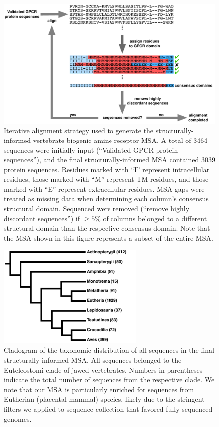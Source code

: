\documentclass[fleqn,10pt]{wlpeerj}
\begin{document}
\newpage

\begin{figure}[htbp]
	\centerline{\includegraphics[width=18cm]{figures/alignment_flowchart.pdf}}
	\caption{\label{flowchart} Iterative alignment strategy used to generate the structurally-informed vertebrate biogenic amine receptor MSA. A total of 3464 sequences were initially input (``Validated GPCR protein sequences''), and the final structurally-informed MSA contained 3039 protein sequences. Residues marked with ``I'' represent intracellular residues, those marked with ``M'' represent TM residues, and those marked with ``E'' represent extracellular residues. MSA gaps were treated as missing data when determining each column's consensus structural domain. Sequenced were removed (``remove highly discordant sequences'') if $\geq 5\%$ of columns belonged to a different structural domain than the respective consensus domain. Note that the MSA shown in this figure represents a subset of the entire MSA.}
\end{figure}


\begin{figure}[htbp]
	\centerline{\includegraphics[width=7cm]{figures/taxonomic_distribution.pdf}}
	\caption{\label{taxa_dist} Cladogram of the taxonomic distribution of all sequences in the final structurally-informed MSA. All sequences belonged to the Euteleostomi clade of jawed vertebrates. Numbers in parentheses indicate the total number of sequences from the respective clade. We note that our MSA is particularly enriched for sequences from Eutherian (placental mammal) species, likely due to the stringent filters we applied to sequence collection that favored fully-sequenced genomes.}
\end{figure}
\end{document}
